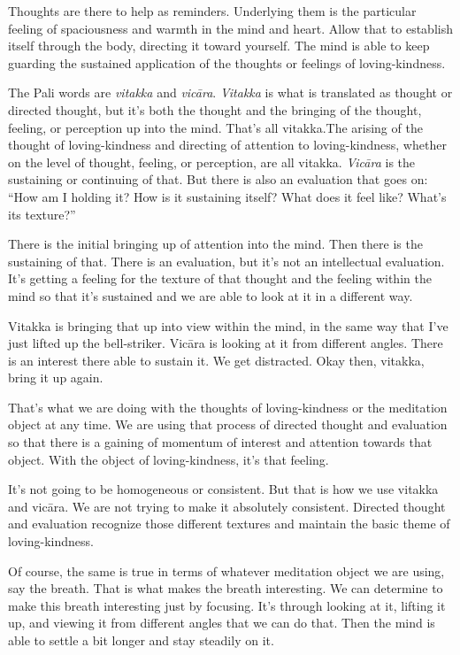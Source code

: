 Thoughts are there to help as reminders. Underlying them is the
particular feeling of spaciousness and warmth in the mind and heart.
Allow that to establish itself through the body, directing it toward
yourself. The mind is able to keep guarding the sustained application of
the thoughts or feelings of loving-kindness.

The Pali words are \emph{vitakka} and \emph{vicāra}. \emph{Vitakka} is
what is translated as thought or directed thought, but it’s both the
thought and the bringing of the thought, feeling, or perception up into
the mind. That’s all vitakka.The arising of the thought of
loving-kindness and directing of attention to loving-kindness, whether
on the level of thought, feeling, or perception, are all vitakka.
\emph{Vicāra} is the sustaining or continuing of that. But there is also
an evaluation that goes on: “How am I holding it? How is it sustaining
itself? What does it feel like? What’s its texture?”

There is the initial bringing up of attention into the mind. Then there
is the sustaining of that. There is an evaluation, but it’s not an
intellectual evaluation. It’s getting a feeling for the texture of that
thought and the feeling within the mind so that it’s sustained and we
are able to look at it in a different way.

Vitakka is bringing that up into view within the mind, in the same way
that I’ve just lifted up the bell-striker. Vicāra is looking at it from
different angles. There is an interest there able to sustain it. We get
distracted. Okay then, vitakka, bring it up again.

That’s what we are doing with the thoughts of loving-kindness or the
meditation object at any time. We are using that process of directed
thought and evaluation so that there is a gaining of momentum of
interest and attention towards that object. With the object of
loving-kindness, it’s that feeling.

It’s not going to be homogeneous or consistent. But that is how we use
vitakka and vicāra. We are not trying to make it absolutely consistent.
Directed thought and evaluation recognize those different textures and
maintain the basic theme of loving-kindness.

Of course, the same is true in terms of whatever meditation object we
are using, say the breath. That is what makes the breath interesting. We
can determine to make this breath interesting just by focusing. It’s
through looking at it, lifting it up, and viewing it from different
angles that we can do that. Then the mind is able to settle a bit longer
and stay steadily on it.

